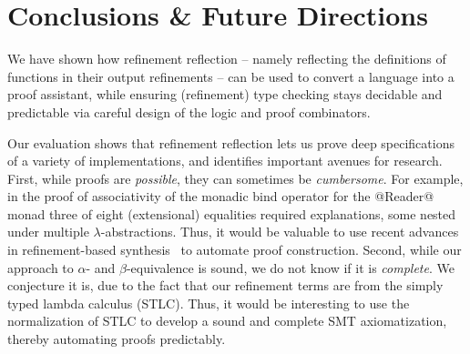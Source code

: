 \section{Conclusions \& Future Directions}

We have shown how refinement reflection -- namely
reflecting the definitions of functions in their
output refinements -- can be used to convert a
language into a proof assistant, while ensuring
(refinement) type checking stays decidable and
predictable via careful design of the logic and
proof combinators.

Our evaluation shows that refinement reflection
lets us prove deep specifications of a variety
of implementations, and identifies
important avenues for research.
%
First, while proofs are \emph{possible}, they can
sometimes be \emph{cumbersome}. For example, in
the proof of associativity of the monadic bind
operator for the @Reader@ monad three of eight
(extensional) equalities required explanations,
some nested under multiple $\lambda$-abstractions.
%
Thus, it would be valuable to use recent
advances in refinement-based synthesis~\cite{polikarpova16}
to automate proof construction.
%
Second, while our approach to $\alpha$- and
$\beta$-equivalence is sound, we do not know
if it is \emph{complete}. We conjecture it is,
due to the fact that our refinement terms
are from the simply typed lambda calculus (STLC).
%
Thus, it would be interesting to use the
normalization of STLC to develop a sound
and complete SMT axiomatization, thereby
automating proofs predictably.

